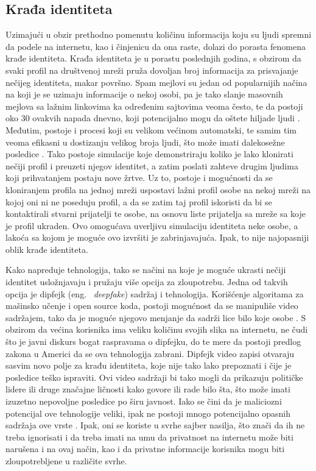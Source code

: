 \documentclass[a4paper]{article}
\begin{document}
\subsection{Krađa identiteta}
Uzimajući u obzir prethodno pomenutu količinu informacija koju su ljudi spremni da podele na internetu, kao i činjenicu da ona raste, dolazi do porasta fenomena krađe identiteta. Krađa identiteta je u porastu poslednjih godina, s obzirom da svaki profil na društvenoj mreži pruža dovoljan broj informacija za prisvajanje nečijeg identiteta, makar površno. Spam mejlovi su jedan od popularnijih načina na koji je se uzimaju informacije o nekoj osobi, pa je tako slanje masovnih mejlova sa lažnim linkovima ka određenim sajtovima veoma često, te da postoji oko 30 ovakvih napada dnevno, koji potencijalno mogu da oštete hiljade ljudi \cite{it1}. Međutim, postoje i procesi koji su velikom većinom automatski, te samim tim veoma efikasni u dostizanju velikog broja ljudi, što može imati dalekosežne posledice \cite{it2}. Tako postoje simulacije koje demonstriraju koliko je lako klonirati nečiji profil i preuzeti njegov identitet, a zatim poslati zahteve drugim ljudima koji prihvatanjem postaju nove žrtve. Uz to, postoje i mogućnosti da se kloniranjem profila na jednoj mreži uspostavi lažni profil osobe na nekoj mreži na kojoj oni ni ne poseduju profil, a da se zatim taj profil iskoristi da bi se kontaktirali stvarni prijatelji te osobe, na osnovu liste prijatelja sa mreže sa koje je profil ukraden. Ovo omogućava uverljivu simulaciju identiteta neke osobe, a lakoća sa kojom je moguće ovo izvršiti je zabrinjavajuća. Ipak, to nije najopasniji oblik krađe identiteta.
\par Kako napreduje tehnologija, tako se načini na koje je moguće ukrasti nečiji identitet usložnjavaju i pružaju više opcija za zloupotrebu. Jedna od takvih opcija je dipfejk (eng. ~{\em deepfake}) sadržaj i tehnologija. Korišćenje algoritama za mašinsko učenje i open source koda, postoji mogućnost da se manipuliše video sadržajem, tako da je moguće njegovo menjanje da sadrži lice bilo koje osobe \cite{it3}.  S obzirom da većina korisnika ima veliku količinu svojih slika na internetu, ne čudi što je javni diskurs bogat raspravama o dipfejku, do te mere da postoji predlog zakona u Americi da se ova tehnologija zabrani. Dipfejk video zapisi otvaraju sasvim novo polje za krađu identiteta, koje nije tako lako prepoznati i čije je posledice teško ispraviti. Ovi video sadržaji bi tako mogli da prikazuju političke lidere ili druge značajne ličnosti kako govore ili rade bilo šta, što može imati izuzetno nepovoljne posledice po širu javnost. Iako se čini da je maliciozni potencijal ove tehnologije veliki, ipak ne postoji mnogo potencijalno opasnih sadržaja ove vrste \cite{it4}. Ipak, oni se koriste u svrhe sajber nasilja, što znači da ih ne treba ignorisati i da treba imati na umu da privatnost na internetu može biti narušena i na ovaj način, kao i da privatne informacije korisnika mogu biti zloupotrebljene u različite svrhe. 
\end{document}
